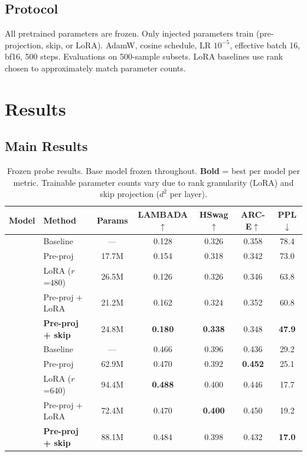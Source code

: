 \documentclass[11pt]{article}
\begin{document}
\subsection{Protocol}

All pretrained parameters are frozen. Only injected parameters train (pre-projection, skip, or LoRA). AdamW, cosine schedule, LR $10^{-5}$, effective batch 16, bf16, 500 steps. Evaluations on 500-sample subsets. LoRA \citep{hu2021lora} baselines use rank chosen to approximately match parameter counts.

\section{Results}

\subsection{Main Results}

\begin{table}[h]
\centering
\caption{Frozen probe results. Base model frozen throughout. \textbf{Bold} = best per model per metric. Trainable parameter counts vary due to rank granularity (LoRA) and skip projection ($d^2$ per layer).}
\label{tab:main_results}
\begin{tabular}{llccccc}
\toprule
\textbf{Model} & \textbf{Method} & \textbf{Params} & \textbf{LAMBADA}$\uparrow$ & \textbf{HSwag}$\uparrow$ & \textbf{ARC-E}$\uparrow$ & \textbf{PPL}$\downarrow$ \\
\midrule
{}
 & Baseline          & ---   & 0.128 & 0.326 & 0.358 & 78.4 \\
 & Pre-proj          & 17.7M & 0.154 & 0.318 & 0.342 & 73.0 \\
 & LoRA ($r$=480)    & 26.5M & 0.126 & 0.326 & 0.346 & 63.8 \\
 & Pre-proj + LoRA   & 21.2M & 0.162 & 0.324 & 0.352 & 60.8 \\
 & \textbf{Pre-proj + skip}  & 24.8M & \textbf{0.180} & \textbf{0.338} & 0.348 & \textbf{47.9} \\
\midrule
{}
 & Baseline          & ---   & 0.466 & 0.396 & 0.436 & 29.2 \\
 & Pre-proj          & 62.9M & 0.470 & 0.392 & \textbf{0.452} & 25.1 \\
 & LoRA ($r$=640)    & 94.4M & \textbf{0.488} & 0.400 & 0.446 & 17.7 \\
 & Pre-proj + LoRA   & 72.4M & 0.470 & \textbf{0.400} & 0.450 & 19.2 \\
 & \textbf{Pre-proj + skip}  & 88.1M & 0.484 & 0.398 & 0.432 & \textbf{17.0} \\
\bottomrule
\end{tabular}
\end{table}
\end{document}
